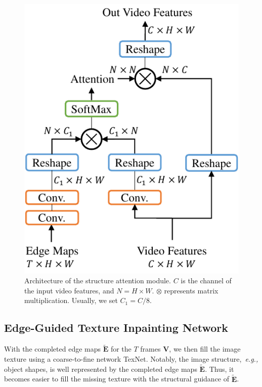 \begin{figure}[t]
	\centering
	\includegraphics[width=0.65\columnwidth]{SAM} %
	\caption{Architecture of the structure attention module. $C$ is the channel of the input video features, and $N=H\times W$. $\otimes$ represents matrix multiplication. Usually, we set $C_1=C/8$.}
	\label{SEM}
\end{figure} 





\subsection{Edge-Guided Texture Inpainting Network}


With the completed edge maps $\boldsymbol{\widetilde{E}}$ for the $T$ frames $\boldsymbol{V}$, we then fill the image texture using a coarse-to-fine network TexNet.
%
Notably, the image structure,~\emph{e.g.,} object shapes, is well represented by the completed edge maps $\boldsymbol{\widetilde{E}}$.
Thus, it becomes easier to fill the missing texture with the structural guidance of $\boldsymbol{\widetilde{E}}$.

